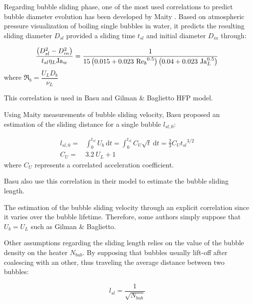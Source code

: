 Regarding bubble sliding phase, one of the most used correlations to predict bubble diameter evolution has been developed by Maity \cite{maity_effect_2000}. Based on atmospheric pressure visualization of boiling single bubbles in water, it predicts the resulting sliding diameter $D_{sl}$ provided a sliding time $t_{sl}$ and initial diameter $D_{in}$ through:

\begin{equation}
\frac{\parth{D_{sl}^{2} - D_{in}^{2}} }{t_{sl} \eta_{L} \Ja_{w}} = \frac{1}{15\parth{0.015+0.023\ {\Re_{b}}^{0.5} } \parth{0.04+0.023\ \Ja_{L}^{0.5}} }
\label{eq:dsl_maity}
\end{equation}
where $\Re_{b}=\dfrac{U_{L}D_{b}}{\nu_{L}}$

\begin{remark*}{}
This correlation is used in Basu \etal and Gilman \& Baglietto HFP model.
\end{remark*}


Using Maity measurements of bubble sliding velocity, Basu \etal proposed an estimation of the sliding distance for a single bubble $l_{sl,0}$:

\begin{align}
l_{sl,0}=& \int_{0}^{t_{sl}} U_{b}\ \mathrm{d}t = \int_{0}^{t_{sl}}C_{U} \sqrt{t}\ \mathrm{d}t =  \frac{2}{3}C_{U}{t_{sl}}^{3/2}
\label{eq:lsl_basu}\\
%
C_{U} =& 3.2\ U_{L}+1
\end{align}
where $C_{U}$ represents a correlated acceleration coefficient.

\begin{remark*}{}
Basu \etal also use this correlation in their model to estimate the bubble sliding length.

The estimation of the bubble sliding velocity through an explicit correlation since it varies over the bubble lifetime. Therefore, some authors simply suppose that $U_{b} = U_{L}$ such as Gilman \& Baglietto.
\end{remark*}


Other assumptions regarding the sliding length relies on the value of the bubble density on the heater $N_{bub}$. By supposing that bubbles usually lift-off after coalescing with an other, thus traveling the average distance between two bubbles:

\begin{equation}
l_{sl} = \frac{1}{\sqrt{N_{bub}}}
\label{eq:lsl_avgdist_bub}
\end{equation}

